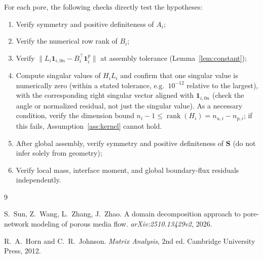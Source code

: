 \documentclass[11pt,a4paper]{article}
\newcommand{\Schur}{\mathbf{S}}
\newcommand{\one}{\mathbf{1}}
\newcommand{\rank}{\operatorname{rank}}
\begin{document}
For each pore, the following checks directly test the hypotheses:
\begin{enumerate}[leftmargin=*,nosep]
  \item Verify symmetry and positive definiteness of $A_i$;
  \item Verify the numerical row rank of $B_i$;
  \item Verify $\|L_i\one_{i,0n} - B_i^\top\one_i^p\|$ at assembly
    tolerance (Lemma~\ref{lem:constant});
  \item Compute singular values of $H_i L_i$ and confirm that one
    singular value is numerically zero (within a stated tolerance,
    e.g.\ $10^{-12}$ relative to the largest), with the corresponding
    right singular vector aligned with $\one_{i,0n}$ (check the angle
    or normalized residual, not just the singular value).
    As a necessary condition, verify the dimension bound
    $n_i - 1 \le \rank(H_i) = n_{u,i} - n_{p,i}$;
    if this fails, Assumption~\ref{ass:kernel} cannot hold.
  \item After global assembly, verify symmetry and positive definiteness
    of $\Schur$ (do not infer solely from geometry);
  \item Verify local mass, interface moment, and global boundary-flux
    residuals independently.
\end{enumerate}

\begin{thebibliography}{9}

S.~Sun, Z.~Wang, L.~Zhang, J.~Zhao.
\newblock A domain decomposition approach to pore-network modeling of porous
  media flow.
\newblock \textit{arXiv:2510.13429v2}, 2026.

R.~A.~Horn and C.~R.~Johnson.
\newblock \textit{Matrix Analysis}, 2nd ed.
\newblock Cambridge University Press, 2012.

\end{thebibliography}
\end{document}
